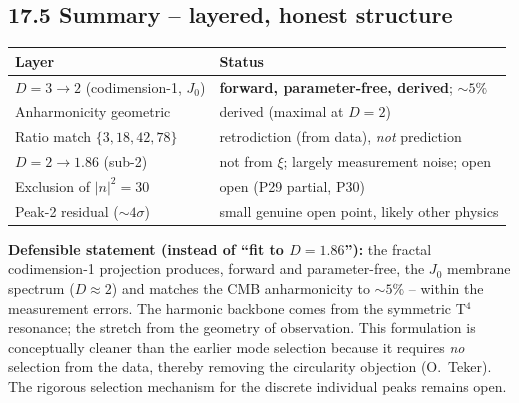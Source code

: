 \subsection*{17.5 Summary -- layered, honest structure}

\begin{center}
\begin{tabular}{p{5.5cm}p{6.5cm}}
\toprule
\textbf{Layer} & \textbf{Status} \\
\midrule
$D=3\to2$ (codimension-1, $J_0$) &
  \textbf{forward, parameter-free, derived}; $\sim5\%$ \\
Anharmonicity geometric &
  derived (maximal at $D=2$) \\
Ratio match $\{3,18,42,78\}$ &
  retrodiction (from data), \emph{not} prediction \\
$D=2\to1.86$ (sub-2) &
  not from $\xi$; largely measurement noise; open \\
Exclusion of $|n|^2=30$ &
  open (P29 partial, P30) \\
Peak-2 residual ($\sim4\sigma$) &
  small genuine open point, likely other physics \\
\bottomrule
\end{tabular}
\end{center}

\textbf{Defensible statement (instead of ``fit to $D=1.86$''):} the fractal
codimension-1 projection produces, forward and parameter-free, the $J_0$
membrane spectrum ($D\approx2$) and matches the CMB anharmonicity to $\sim5\%$
-- within the measurement errors. The harmonic backbone comes from the
symmetric T$^4$ resonance; the stretch from the geometry of observation. This
formulation is conceptually cleaner than the earlier mode selection because it
requires \emph{no} selection from the data, thereby removing the circularity
objection (O.~Teker). The rigorous selection mechanism for the discrete
individual peaks remains open.
